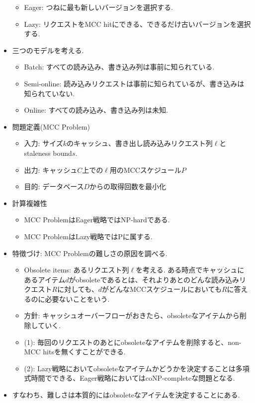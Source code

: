 \documentclass[dvipdfmx,uplatex]{jsarticle}
\theoremstyle{remark}
\newenvironment{method}[1]{
    \begin{tcolorbox}[
        colframe=green!50!black,
        colback=green!50!black!10!white,
        colbacktitle=green!50!black!40!white,
        coltitle=black,
        fonttitle=\bfseries,
        title={#1}
    ]
}{
    \end{tcolorbox}
}
\begin{document}
\begin{method}{MCC Policy}
\begin{itemize}
    \begin{itemize}
        \item Eager: つねに最も新しいバージョンを選択する.
        \item Lazy: リクエストをMCC hitにできる、できるだけ古いバージョンを選択する.
    \end{itemize}
    \item 三つのモデルを考える.
    \begin{itemize}
        \item Batch: すべての読み込み、書き込み列は事前に知られている.
        \item Semi-online: 読み込みリクエストは事前に知られているが、書き込みは知られていない.
        \item Online: すべての読み込み、書き込み列は未知.
    \end{itemize}
\end{itemize}
\end{method}

\begin{method}{複雑性と特徴づけ}
\begin{itemize}
    \item 問題定義(MCC Problem)
    \begin{itemize}
        \item 入力: サイズ$k$のキャッシュ、書き出し読み込みリクエスト列$\ell$とstaleness bound$s$.
        \item 出力: キャッシュ$C$上での$\ell$用のMCCスケジュール$P$
        \item 目的: データベース$D$からの取得回数を最小化
    \end{itemize}
    \item 計算複雑性
    \begin{itemize}
        \item MCC ProblemはEager戦略ではNP-hardである.
        \item MCC ProblemはLazy戦略ではPに属する.
    \end{itemize}
    \item 特徴づけ: MCC Problemの難しさの原因を調べる.
    \begin{itemize}
        \item Obsolete items: あるリクエスト列$\ell$を考える. ある時点でキャッシュにあるアイテム$d$がobsoleteであるとは、それよりあとのどんな読み込みリクエスト$R$に対しても、$d$がどんなMCCスケジュールにおいても$R$に答えるのに必要ないことをいう.
        \item 方針: キャッシュオーバーフローがおきたら、obsoleteなアイテムから削除していく.
        \item (1): 毎回のリクエストのあとにobsoleteなアイテムを削除すると、non-MCC hitsを無くすことができる.
        \item (2): Lazy戦略においてobsoleteなアイテムかどうかを決定することは多項式時間でできる、Eager戦略においてはcoNP-completeな問題となる.
    \end{itemize}
    \item すなわち、難しさは本質的にはobsoleteなアイテムを決定することにある.
\end{itemize}
\end{method}
\end{document}
